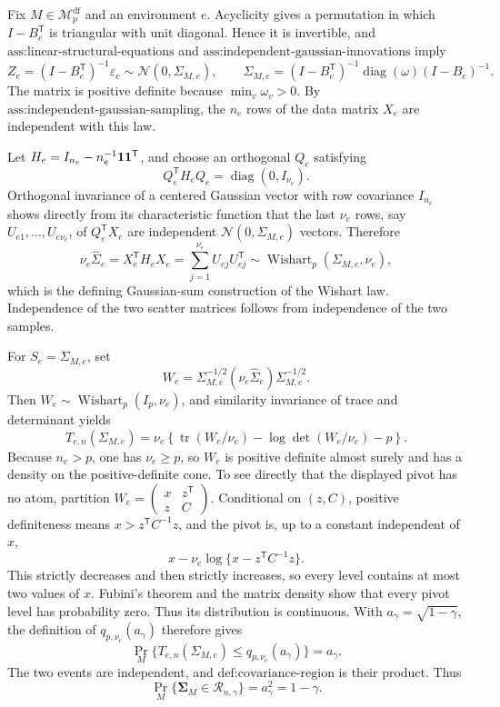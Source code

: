 Fix \(M\in\mathcal M_p^{\mathrm{df}}\) and an environment \(e\).  Acyclicity gives a permutation in which \(I-B_e^{\mathsf T}\) is triangular with unit diagonal.  Hence it is invertible, and \(\text{ass:linear-structural-equations}\) and \(\text{ass:independent-gaussian-innovations}\) imply
\[
 Z_e=(I-B_e^{\mathsf T})^{-1}\varepsilon_e
 \sim\mathcal N(0,\Sigma_{M,e}),\qquad
 \Sigma_{M,e}=(I-B_e^{\mathsf T})^{-1}
          \operatorname{diag}(\omega)(I-B_e)^{-1}.
\]
The matrix is positive definite because \(\min_v\omega_v>0\).  By \(\text{ass:independent-gaussian-sampling}\), the \(n_e\) rows of the data matrix \(X_e\) are independent with this law.

Let \(H_e=I_{n_e}-n_e^{-1}{\bf 1}{\bf 1}^{\mathsf T}\), and choose an orthogonal \(Q_e\) satisfying
\[
 Q_e^{\mathsf T}H_eQ_e=\operatorname{diag}(0,I_{\nu_e}).
\]
Orthogonal invariance of a centered Gaussian vector with row covariance \(I_{n_e}\) shows directly from its characteristic function that the last \(\nu_e\) rows, say \(U_{e1},\ldots,U_{e\nu_e}\), of \(Q_e^{\mathsf T}X_e\) are independent \(\mathcal N(0,\Sigma_{M,e})\) vectors.  Therefore
\[
 \nu_e\widehat\Sigma_e=X_e^{\mathsf T}H_eX_e
   =\sum_{j=1}^{\nu_e}U_{ej}U_{ej}^{\mathsf T}
   \sim\operatorname{Wishart}_p(\Sigma_{M,e},\nu_e),
\]
which is the defining Gaussian-sum construction of the Wishart law.  Independence of the two scatter matrices follows from independence of the two samples.

For \(S_e=\Sigma_{M,e}\), set
\[
 W_e=\Sigma_{M,e}^{-1/2}(\nu_e\widehat\Sigma_e)
                 \Sigma_{M,e}^{-1/2}.
\]
Then \(W_e\sim\operatorname{Wishart}_p(I_p,\nu_e)\), and similarity invariance of trace and determinant yields
\[
 T_{e,n}(\Sigma_{M,e})
 =\nu_e\left\{\operatorname{tr}(W_e/\nu_e)
      -\log\det(W_e/\nu_e)-p\right\}.
\]
Because \(n_e>p\), one has \(\nu_e\ge p\), so \(W_e\) is positive definite almost surely and has a density on the positive-definite cone.  To see directly that the displayed pivot has no atom, partition \(W_e=\left(\begin{smallmatrix}x&z^{\mathsf T}\\z&C\end{smallmatrix}\right)\).  Conditional on \((z,C)\), positive definiteness means \(x>z^{\mathsf T}C^{-1}z\), and the pivot is, up to a constant independent of \(x\),
\[
 x-\nu_e\log\{x-z^{\mathsf T}C^{-1}z\}.
\]
This strictly decreases and then strictly increases, so every level contains at most two values of \(x\).  Fubini's theorem and the matrix density show that every pivot level has probability zero.  Thus its distribution is continuous.  With \(a_\gamma=\sqrt{1-\gamma}\), the definition of \(q_{p,\nu_e}(a_\gamma)\) therefore gives
\[
 \Pr_M\{T_{e,n}(\Sigma_{M,e})\le q_{p,\nu_e}(a_\gamma)\}=a_\gamma.
\]
The two events are independent, and \(\text{def:covariance-region}\) is their product.  Thus
\[
 \Pr_M\{\boldsymbol\Sigma_M\in\mathcal R_{n,\gamma}\}
 =a_\gamma^2=1-\gamma.
\]